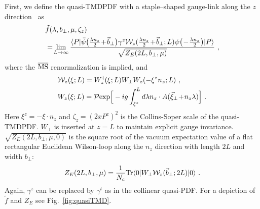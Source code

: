 \documentclass[aps,rmp,reprint,amsmath,amssymb,graphicx,longbibliography]{revtex4-1} %
\newcommand{\MS}{{\overline{\rm MS}}}
\begin{document}
First, we define the quasi-TMDPDF with a staple–shaped gauge-link along the $z$ direction~\cite{Ji:2014hxa,Ji:2018hvs,Ebert:2019okf,Ji:2019ewn} as
\begin{align}\label{eq:quasi_TMD}
	& \tilde f(\lambda ,b_\perp,\mu,\zeta_z) \\
	&=\! \lim_{L \rightarrow \infty}  \frac{\langle P| \bar \psi\big(\frac{\lambda n_z }{2}\!+\!\vec{b}_\perp\big)\gamma^z{\cal W}_{z}(\frac{\lambda n_z}{2}\!+\!\vec{b}_\perp;L)\psi\big(\!-\!\frac{\lambda n_z}{2}\big) |P\rangle}{\sqrt{Z_E(2L,b_\perp,\mu)}} \ , \nonumber
\end{align}
where the $\MS$ renormalization is implied, and
\begin{align}\label{eq:staplez}
	&{\cal W}_z(\xi;L)=W^{\dagger}_{z}(\xi; L)W_{\perp}W_{z}(-\xi^zn_z;L)  \ ,\\
	&W_{z}(\xi;L)= {\cal P}{\rm exp}\Big[-ig\int_{\xi^z}^{L} d\lambda n_z\cdot A(\vec{\xi}_\perp\!+\!n_z \lambda)\Big] \ .
\end{align}
Here $\xi^z=-\xi\cdot n_z$ and $\zeta_z=(2xP^z)^2$ is the Collins-Soper scale of the quasi-TMDPDF. $W_{\perp}$ is inserted at $z=L$ to maintain explicit gauge invariance. $\sqrt{Z_E(2L,b_\perp,\mu,0)}$ is the square root of the vacuum expectation value of a flat rectangular Euclidean Wilson-loop along the $n_z$ direction with length $2L$ and width $b_\perp$:
\begin{align}\label{eq:Z_E}
	Z_E(2L,b_\perp,\mu)=\frac{1}{N_c}{\rm Tr}\langle 0|W_{\perp}{\cal W}_z(\vec{b}_\perp;2L)|0\rangle \ .
\end{align}
Again, $\gamma^z$ can be replaced by $\gamma^t$ as in the collinear quasi-PDF.
For a depiction of $\tilde f$ and $Z_E$ see Fig.~\ref{fig:quasiTMD}.
\end{document}
